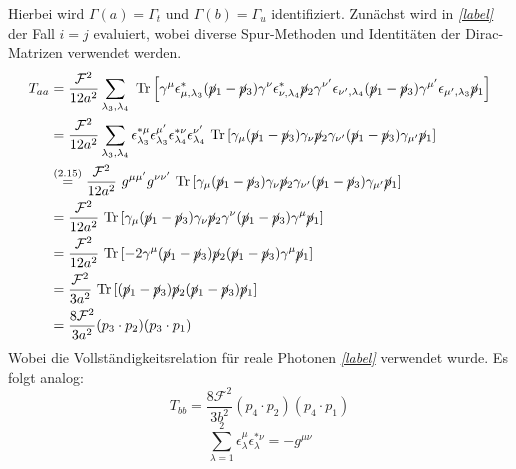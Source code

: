 Hierbei wird $\Gamma(a) = \Gamma_t$ und $ \Gamma(b) = \Gamma_u$ identifiziert. Zunächst wird in \textit{\autoref{label}} der Fall $i = j$ evaluiert, wobei diverse Spur-Methoden und Identitäten der Dirac-Matrizen verwendet werden.
\begin{equation}
\begin{aligned}
T_{aa} &= \frac{\mathcal{F}^2}{12a^2} \sum_{\lambda_3, \lambda_4}~\text{Tr}\left[ \gamma^\mu \epsilon^*_{\mu,\lambda_3} (\cancel{p}_1- \cancel{p}_3)  \gamma^\nu \epsilon_{\nu, \lambda_4}^* \cancel{p}_2 \gamma^{\nu'} \epsilon_{\nu', \lambda_4} (\cancel{p}_1- \cancel{p}_3)  \gamma^{\mu'} \epsilon_{\mu', \lambda_3} \cancel{p}_1 \right] \\
&= \frac{\mathcal{F}^2}{12a^2} \sum_{\lambda_3, \lambda_4}\epsilon^{*\mu}_{\lambda_3}\epsilon^{\mu'} _{\lambda_3} \epsilon^{*\nu}_{\lambda_4}\epsilon^{\nu'}_{\lambda_4}~\text{Tr}\left[ \gamma_\mu (\cancel{p}_1- \cancel{p}_3)  \gamma_\nu \cancel{p}_2 \gamma_{\nu'} (\cancel{p}_1- \cancel{p}_3)  \gamma_{\mu'} \cancel{p}_1\right]\\
&\overset{\text{(2.15)}}{=}\frac{\mathcal{F}^2}{12a^2}~g^{\mu\mu'}g^{\nu\nu'}~\text{Tr}\left[ \gamma_\mu (\cancel{p}_1- \cancel{p}_3)  \gamma_\nu \cancel{p}_2 \gamma_{\nu'} (\cancel{p}_1- \cancel{p}_3)  \gamma_{\mu'} \cancel{p}_1\right] \\
&=\frac{\mathcal{F}^2}{12a^2}~\text{Tr}\left[ \gamma_\mu (\cancel{p}_1- \cancel{p}_3)  \gamma_\nu \cancel{p}_2 \gamma^{\nu} (\cancel{p}_1- \cancel{p}_3)  \gamma^{\mu} \cancel{p}_1\right]\\
&=\frac{\mathcal{F}^2}{12a^2}~\text{Tr}\left[-2\gamma^\mu(\cancel{p}_1- \cancel{p}_3) \cancel{p}_2 (\cancel{p}_1- \cancel{p}_3)\gamma^\mu \cancel{p}_1\right] \\
&=\frac{\mathcal{F}^2}{3a^2}~\text{Tr}\left[(\cancel{p}_1- \cancel{p}_3) \cancel{p}_2 (\cancel{p}_1- \cancel{p}_3)\cancel{p}_1\right] \\
&=\frac{8\mathcal{F}^2}{3a^2}(p_3\cdot p_2)(p_3\cdot p_1)
\end{aligned}
\end{equation}
Wobei die Vollständigkeitsrelation für reale Photonen \textit{\autoref{label}} verwendet wurde. Es folgt analog:
\begin{equation}
T_{bb} = \frac{8\mathcal{F}^2}{3b^2}(p_4\cdot p_2)(p_4\cdot p_1)
\end{equation}
\begin{equation}
\sum_{\lambda = 1}^{2} \epsilon^\mu_{\lambda} \epsilon^{*\nu}_{\lambda} = -g^{\mu \nu}
\label{Vollständigkeit}
\end{equation}
